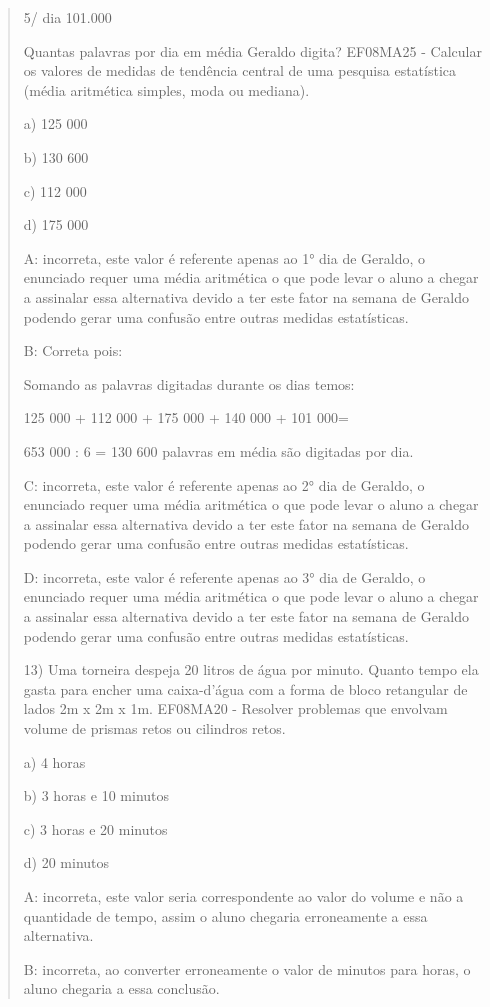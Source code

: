 \begin{quote}
\begin{escolha}
5/ dia 101.000

Quantas palavras por dia em média Geraldo digita? EF08MA25 - Calcular os
valores de medidas de tendência central de uma pesquisa estatística
(média aritmética simples, moda ou mediana).

a) 125 000

b) 130 600

c) 112 000

d) 175 000

A: incorreta, este valor é referente apenas ao 1° dia de Geraldo, o
enunciado requer uma média aritmética o que pode levar o aluno a chegar
a assinalar essa alternativa devido a ter este fator na semana de
Geraldo podendo gerar uma confusão entre outras medidas estatísticas.

B: Correta pois:

Somando as palavras digitadas durante os dias temos:

125 000 + 112 000 + 175 000 + 140 000 + 101 000=

653 000 : 6 = 130 600 palavras em média são digitadas por dia.

C: incorreta, este valor é referente apenas ao 2° dia de Geraldo, o
enunciado requer uma média aritmética o que pode levar o aluno a chegar
a assinalar essa alternativa devido a ter este fator na semana de
Geraldo podendo gerar uma confusão entre outras medidas estatísticas.

D: incorreta, este valor é referente apenas ao 3° dia de Geraldo, o
enunciado requer uma média aritmética o que pode levar o aluno a chegar
a assinalar essa alternativa devido a ter este fator na semana de
Geraldo podendo gerar uma confusão entre outras medidas estatísticas.

13) Uma torneira despeja 20 litros de água por minuto. Quanto tempo ela
gasta para encher uma caixa-d'água com a forma de bloco retangular de
lados 2m x 2m x 1m. EF08MA20 - Resolver problemas que envolvam volume de
prismas retos ou cilindros retos.

a) 4 horas

b) 3 horas e 10 minutos

c) 3 horas e 20 minutos

d) 20 minutos

A: incorreta, este valor seria correspondente ao valor do volume e não a
quantidade de tempo, assim o aluno chegaria erroneamente a essa
alternativa.

B: incorreta, ao converter erroneamente o valor de minutos para horas, o
aluno chegaria a essa conclusão.


\end{escolha}
\end{quote}
